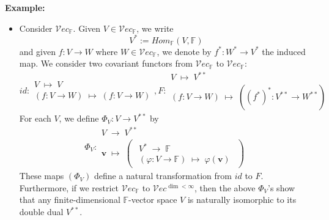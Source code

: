 \noindent\textbf{Example:} 
\begin{itemize}
    \item Consider $\mathcal{V}ec_\mathbb{F}$. Given $V \in \mathcal{V}ec_\mathbb{F}$, we write
    $$V^* := Hom_\mathbb{F} (V,\mathbb{F})$$
    and given $f: V \to W$ where $W \in \mathcal{V}ec_\mathbb{F}$, we denote by $f^*: W^* \to V^*$ the induced map. We consider two covariant functors from $\mathcal{V}ec_\mathbb{F}$ to $\mathcal{V}ec_\mathbb{F}$:
    $$id:\substack{V \; \mapsto \; V\\
    (f: V \to W) \; \mapsto \; (f: V \to W)} , F: \substack{V \; \mapsto \; V^{**}\\
    (f: V \to W) \; \mapsto \; ((f^{*})^{*} : V^{**} \to W^{**})}$$
    For each $V$, we define $\Phi_V: V \to V^{**}$ by
    $$\Phi_V : \substack{V \; \to \; V^{**}\\
    \mathbf{v} \; \mapsto \; \begin{pmatrix}
        \substack{V^* \; \to \; \mathbb{F}\\
        (\varphi : V \to \mathbb{F}) \; \mapsto \; \varphi(\mathbf{v})}
    \end{pmatrix}}$$
    These maps $(\Phi_V)$ define a natural transformation from $id$ to $F$. Furthermore, if we restrict $\mathcal{V}ec_\mathbb{F}$ to $\mathcal{V}ec^{\dim < \infty}$, then the above $\Phi_V$'s show that any finite-dimensional $\mathbb{F}$-vector space $V$ is naturally isomorphic to its double dual $V^{**}$.


\end{itemize}
